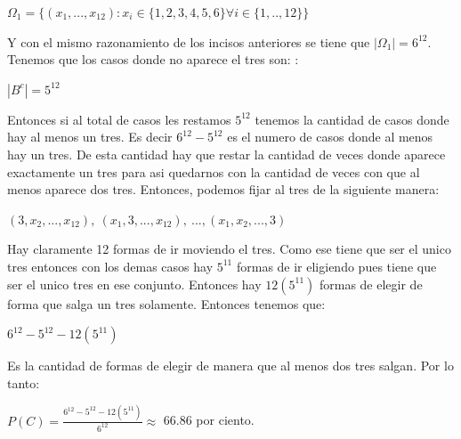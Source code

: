 \documentclass[12pt,a4paper]{report}
\begin{document}
\begin{enumerate}
{\begin{enumerate}[label=\alph*) ]
{    \begin{center}
    $\Omega_{1}= \lbrace (x_{1},...,x_{12}): x_{i}\in \lbrace 1,2,3,4,5,6 \rbrace \forall i \in \lbrace 1,..,12 \rbrace \rbrace$
    \end{center}
    Y con el mismo razonamiento de los incisos anteriores se tiene que $|\Omega_{1}|=6^{12}$. Tenemos que los casos donde no aparece el tres son: :\\
    \begin{center}
    $|B^c|= 5^{12}$
    \end{center}
    Entonces si al total de casos les restamos $5^{12}$ tenemos la cantidad de casos donde hay al menos un tres. Es decir $6^{12}-5^{12}$ es el numero de casos donde al menos hay un tres. De esta cantidad hay que restar la cantidad de veces donde aparece exactamente un tres para asi quedarnos con la cantidad de veces con que al menos aparece dos tres. Entonces, podemos fijar al tres de la siguiente manera:\\
    \begin{center}
    $(3,x_{2},...,x_{12}), \ (x_{1},3,...,x_{12}), \ ... ,(x_{1},x_{2},...,3)$
    \end{center}
    Hay claramente 12 formas de ir moviendo el tres. Como ese tiene que ser el unico tres entonces con los demas casos hay $5^{11}$ formas de ir eligiendo pues tiene que ser el unico tres en ese conjunto. Entonces hay $12(5^{11})$ formas de elegir de forma que salga un tres solamente. Entonces tenemos que:\\
    \begin{center}
    $6^{12}-5^{12}-12(5^{11})$
    \end{center}
    Es la cantidad de formas de elegir de manera que al menos dos tres salgan. Por lo tanto:\\
    \begin{center}
    $P(C)=\frac{6^{12}-5^{12}-12(5^{11})}{6^{12}} \approx$ 66.86 por ciento.
    \end{center}
    
    }
    \end{enumerate}
	}



\end{enumerate}
\end{document}
